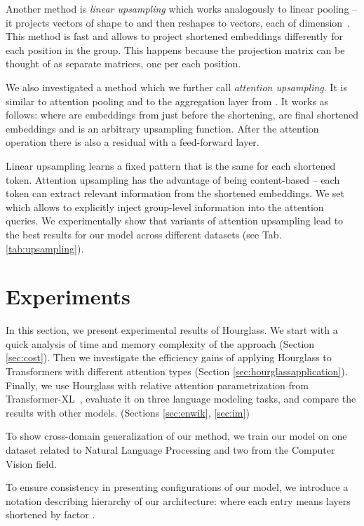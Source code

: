 \documentclass[11pt]{article}
\begin{document}
Another method is \emph{linear upsampling} which works analogously to linear pooling -- it projects vectors of shape  to  and then reshapes to  vectors, each of dimension~. This method is fast and allows to project shortened embeddings differently for each position in the group. This happens because the  projection matrix can be thought of as  separate  matrices, one per each position. 

We also investigated a method which we further call \emph{attention upsampling}. It is similar to attention pooling \cite{dai2020funneltransformer} and to the aggregation layer from \cite{subramanian2020multiscale}. It works as follows:  where  are embeddings from just before the shortening,  are final shortened embeddings and  is an arbitrary upsampling function. After the attention operation there is also a residual with a feed-forward layer.

Linear upsampling learns a fixed pattern that is the same for each shortened token. Attention upsampling has the advantage of being content-based -- each token can extract relevant information from the shortened embeddings. We set  which allows to explicitly inject group-level information into the attention queries. We experimentally show that variants of attention upsampling lead to the best results for our model across different datasets (see Tab. \ref{tab:upsampling}).

\section{Experiments}

In this section, we present experimental results of Hourglass. We start with a quick analysis of time and memory complexity of the approach (Section \ref{sec:cost}). Then we investigate the efficiency gains of applying Hourglass to Transformers with different attention types (Section \ref{sec:hourglassapplication}). Finally, we use Hourglass with relative attention parametrization from Transformer-XL~\cite{dai2019transformerxl}, evaluate it on three language modeling tasks, and compare the results with other models. (Sections \ref{sec:enwik}, \ref{sec:im})

To show cross-domain generalization of our method, we train our model on one dataset related to Natural Language Processing and two from the Computer Vision field.

To ensure consistency in presenting configurations of our model, we introduce a notation describing hierarchy of our architecture:  where each entry  means  layers shortened by factor . 
\end{document}
